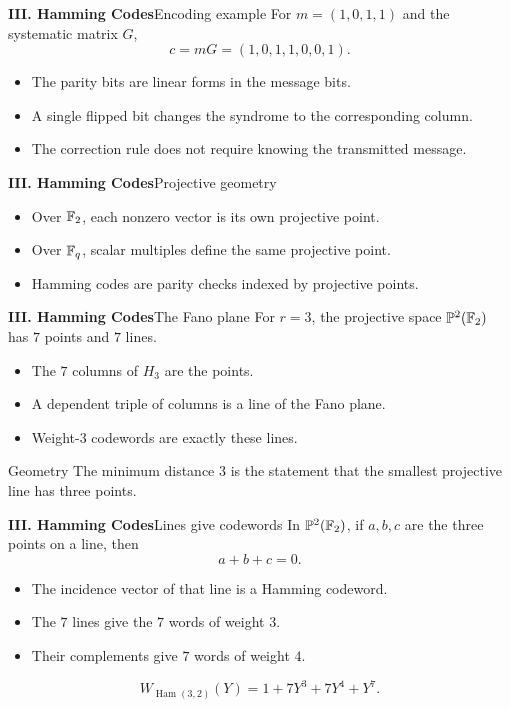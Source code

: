 \begin{frame}{\textbf{III. Hamming Codes}}{Encoding example}
\small
For $m=(1,0,1,1)$ and the systematic matrix $G$,
\[
  c=mG=(1,0,1,1,0,0,1).
\]
\begin{itemize}
  \item The parity bits are linear forms in the message bits.
  \item A single flipped bit changes the syndrome to the corresponding column.
  \item The correction rule does not require knowing the transmitted message.
\end{itemize}
\end{frame}

\begin{frame}{\textbf{III. Hamming Codes}}{Projective geometry}
\small
{}
\begin{itemize}
  \item Over $\mathbb{F}_2$, each nonzero vector is its own projective point.
  \item Over $\mathbb{F}_q$, scalar multiples define the same projective point.
  \item Hamming codes are parity checks indexed by projective points.
\end{itemize}
\end{frame}

\begin{frame}{\textbf{III. Hamming Codes}}{The Fano plane}
\small
For $r=3$, the projective space $\mathbb{P}^2(\mathbb{F}_2)$ has $7$ points and $7$ lines.
\begin{itemize}
  \item The $7$ columns of $H_3$ are the points.
  \item A dependent triple of columns is a line of the Fano plane.
  \item Weight-$3$ codewords are exactly these lines.
\end{itemize}
\begin{block}{Geometry}
The minimum distance $3$ is the statement that the smallest projective line has three points.
\end{block}
\end{frame}

\begin{frame}{\textbf{III. Hamming Codes}}{Lines give codewords}
\small
In $\mathbb{P}^2(\mathbb{F}_2)$, if $a,b,c$ are the three points on a line, then
\[
  a+b+c=0.
\]
\begin{itemize}
  \item The incidence vector of that line is a Hamming codeword.
  \item The $7$ lines give the $7$ words of weight $3$.
  \item Their complements give $7$ words of weight $4$.
\end{itemize}
\[
  W_{\operatorname{Ham}(3,2)}(Y)=1+7Y^3+7Y^4+Y^7.
\]
\end{frame}

